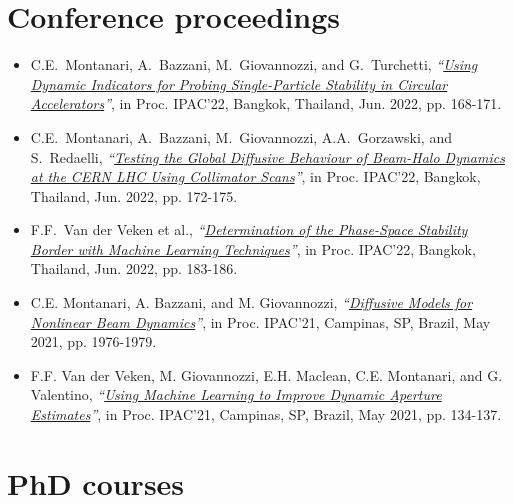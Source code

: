 \section*{Conference proceedings}
 
\begin{itemize}
    \item C.E.\ Montanari, A.\ Bazzani, M.\ Giovannozzi, and G.\ Turchetti, \textit{``\href{
https://doi.org/10.18429/JACoW-IPAC2022-MOPOST042}{Using Dynamic Indicators for Probing Single-Particle Stability in Circular Accelerators}''}, in Proc. IPAC'22, Bangkok, Thailand, Jun. 2022, pp. 168-171.

    \item C.E.\ Montanari, A.\ Bazzani, M.\ Giovannozzi, A.A.\ Gorzawski, and S.\ Redaelli, \textit{``\href{https://doi.org/10.18429/JACoW-IPAC2022-MOPOST043}{Testing the Global Diffusive Behaviour of Beam-Halo Dynamics at the CERN LHC Using Collimator Scans}''}, in Proc. IPAC'22, Bangkok, Thailand, Jun. 2022, pp. 172-175.

    \item F.F.\ Van der Veken et al., \textit{``\href{https://doi.org/10.18429/JACoW-IPAC2022-MOPOST047}{Determination of the Phase-Space Stability Border with Machine Learning Techniques}''}, in Proc. IPAC'22, Bangkok, Thailand, Jun. 2022, pp. 183-186.

    \item C.E. Montanari, A. Bazzani, and M. Giovannozzi, \textit{``\href{https://doi.org/10.18429/JACoW-IPAC2021-TUPAB233}{Diffusive Models for Nonlinear Beam Dynamics}''}, in Proc. IPAC'21, Campinas, SP, Brazil, May 2021, pp. 1976-1979.

    \item F.F. Van der Veken, M. Giovannozzi, E.H. Maclean, C.E. Montanari, and G. Valentino, \textit{``\href{https://doi.org/10.18429/JACoW-IPAC2021-MOPAB028}{Using Machine Learning to Improve Dynamic Aperture Estimates}''}, in Proc. IPAC'21, Campinas, SP, Brazil, May 2021, pp. 134-137.
\end{itemize}

\section*{PhD courses}

